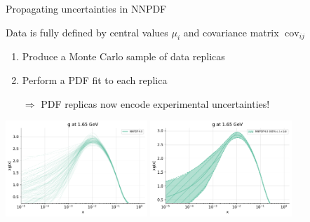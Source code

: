 \documentclass[8pt,t]{beamer}
\begin{document}
\begin{frame}{Propagating uncertainties in NNPDF}

  Data is fully defined by central values $\mu_i$ and covariance matrix $\operatorname{cov}_{ij}$
  \begin{enumerate}
    \item Produce a Monte Carlo sample of data replicas
    \item Perform a PDF fit to each replica
    \item[$\Rightarrow$] PDF replicas now encode experimental uncertainties!
  \end{enumerate}

  \vspace*{2em}
  \begin{center}
    \includegraphics[width=0.4\textwidth]{replicas_g.pdf}
    \includegraphics[width=0.4\textwidth]{band_g.pdf}
  \end{center}
\end{frame}
\end{document}
